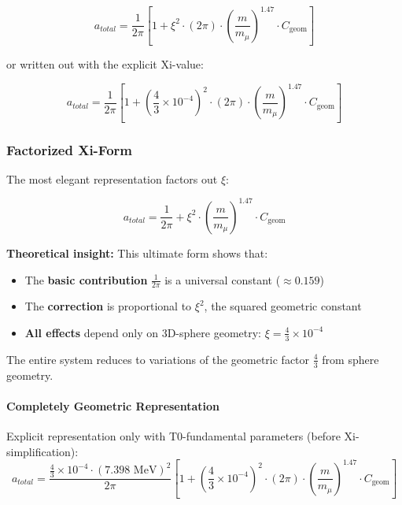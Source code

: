 \documentclass[12pt,a4paper]{article}
\numberwithin{equation}{section}
\newcommand{\xipar}{\xi}
\newcommand{\Cgeom}{C_{\text{geom}}}
\newcommand{\mmu}{m_{\mu}}
\begin{document}
	\begin{equation}
		\boxed{a_{total} = \frac{1}{2\pi} \left[1 + \xipar^2 \cdot (2\pi) \cdot \left(\frac{m}{\mmu}\right)^{1.47} \cdot \Cgeom\right]}
	\end{equation}
	
	or written out with the explicit Xi-value:
	
	\begin{equation}
		\boxed{a_{total} = \frac{1}{2\pi} \left[1 + \left(\frac{4}{3} \times 10^{-4}\right)^2 \cdot (2\pi) \cdot \left(\frac{m}{\mmu}\right)^{1.47} \cdot \Cgeom\right]}
	\end{equation}
	
	\subsubsection{Factorized Xi-Form}
	
	The most elegant representation factors out $\xipar$:
	
	\begin{equation}
		\boxed{a_{total} = \frac{1}{2\pi} + \xipar^2 \cdot \left(\frac{m}{\mmu}\right)^{1.47} \cdot \Cgeom}
	\end{equation}
	
	\textbf{Theoretical insight:} This ultimate form shows that:
	\begin{itemize}
		\item The \textbf{basic contribution} $\frac{1}{2\pi}$ is a universal constant ($\approx 0.159$)
		\item The \textbf{correction} is proportional to $\xipar^2$, the squared geometric constant
		\item \textbf{All effects} depend only on 3D-sphere geometry: $\xipar = \frac{4}{3} \times 10^{-4}$
	\end{itemize}
	
	The entire system reduces to variations of the geometric factor $\frac{4}{3}$ from sphere geometry.
	
	\paragraph{Completely Geometric Representation}
	
	Explicit representation only with T0-fundamental parameters (before Xi-simplification):
	\begin{equation}
		\boxed{a_{total} = \frac{\frac{4}{3} \times 10^{-4} \cdot (7.398 \text{ MeV})^2}{2\pi} \left[1 + \left(\frac{4}{3} \times 10^{-4}\right)^2 \cdot (2\pi) \cdot \left(\frac{m}{\mmu}\right)^{1.47} \cdot \Cgeom\right]}
	\end{equation}
\end{document}
